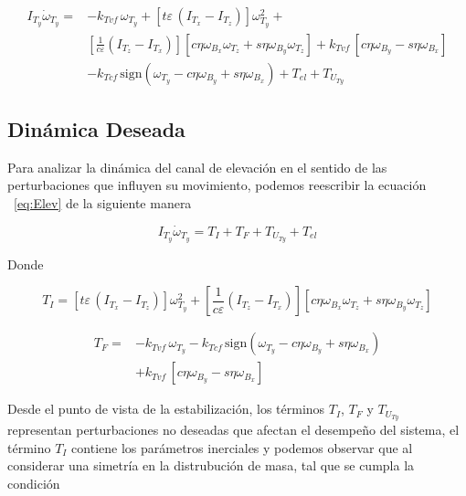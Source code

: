 \begin{equation}
\begin{array}{cl}
I_{T_y}\dot{\omega}_{T_y} = & -k_{Tvf} \, \omega_{T_y} + \left[ t\varepsilon \, \left(I_{T_x}-I_{T_z}\right) \right]\omega_{T_y}^2 + \\
 &\left[ \frac{1}{c \varepsilon} \left(I_{T_z}-I_{T_x}\right) \right] \left[ c \eta \omega_{B_x} \omega _{T_z} + s \eta \omega_{B_y} \omega _{T_z} \right] + k_{Tvf} \, \left[ c \eta \omega_{B_y} - s \eta \omega_{B_x} \right] \\
 & -  k_{Tcf} \, \mathrm{sign}\left( \omega_{T_y} - c \eta \omega_{B_y} + s \eta \omega_{B_x} \right) + T_{el} + T_{U_{Ty}}
\end{array}
\label{eq:Elev}
\end{equation}

\subsection{Din\'{a}mica Deseada}\label{sec:DinDes}

Para analizar la din\'{a}mica del canal de elevaci\'{o}n en el sentido de las perturbaciones  que influyen su movimiento, podemos reescribir la ecuaci\'{o}n ~\ref{eq:Elev} de la siguiente manera 

\begin{equation}
I_{T_y}\dot{\omega}_{T_y} = T_I + T_F + T_{U_{Ty}} + T_{el}
\end{equation}

Donde

\begin{equation}
T_I=\left[ t\varepsilon \, \left(I_{T_x}-I_{T_z}\right) \right]\omega_{T_y}^2 + \left[ \frac{1}{c \varepsilon} \left(I_{T_z}-I_{T_x}\right) \right] \left[ c \eta \omega_{B_x} \omega _{T_z} + s \eta \omega_{B_y} \omega _{T_z} \right] 
\end{equation}

\begin{equation}
\begin{array}{cl}
T_F=&-k_{Tvf} \, \omega_{T_y} -  k_{Tcf} \, \mathrm{sign}\left( \omega_{T_y} - c \eta \omega_{B_y} + s \eta \omega_{B_x} \right)\\
 &+ k_{Tvf} \, \left[ c \eta \omega_{B_y} - s \eta \omega_{B_x} \right]
\end{array}
\end{equation}

Desde el punto de vista de la estabilizaci\'{o}n, los t\'{e}rminos $T_I$, $T_F$ y $T_{U_{Ty}}$ representan perturbaciones no deseadas que afectan el desempe\~{n}o del sistema, el t\'{e}rmino $T_I$ contiene los par\'{a}metros inerciales y podemos observar que al considerar una simetr\'{i}a en la distrubuci\'{o}n de masa, tal que se cumpla la condici\'{o}n


